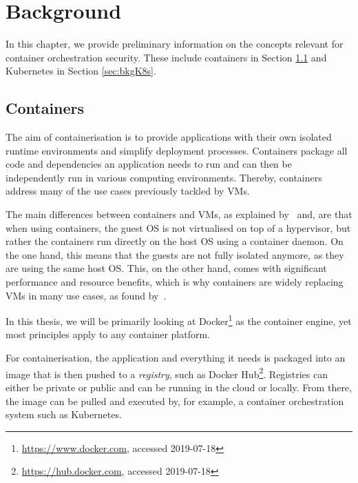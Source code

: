 
\chapter{Background} \label{cha:background}

In this chapter, we provide preliminary information on the concepts relevant for container orchestration security. These include containers in Section \ref{sec:bkgContainers} and Kubernetes in Section \ref{sec:bkgK8s}.

\section{Containers} \label{sec:bkgContainers}

The aim of containerisation is to provide applications with their own isolated runtime environments and simplify deployment processes. Containers package all code and dependencies an application needs to run and can then be independently run in various computing environments. Thereby, containers address many of the use cases previously tackled by \acp{VM}. 

The main differences between containers and \acp{VM}, as explained by~\textcite{containersVsVMs} and\textcite{containersVsVMsComparison}, are that when using containers, the guest OS is not virtualised on top of a hypervisor, but rather the containers run directly on the host OS using a container daemon. On the one hand, this means that the guests are not fully isolated anymore, as they are using the same host OS. This, on the other hand, comes with significant performance and resource benefits, which is why containers are widely replacing \acp{VM} in many use cases, as found by~\textcite{redhatOutlook}.

In this thesis, we will be primarily looking at Docker\footnote{\url{https://www.docker.com}, accessed 2019-07-18} as the container engine, yet most principles apply to any container platform.

For containerisation, the application and everything it needs is packaged into an image that is then pushed to a \textit{registry}, such as Docker Hub\footnote{\url{https://hub.docker.com}, accessed 2019-07-18}. Registries can either be private or public and can be running in the cloud or locally. From there, the image can be pulled and executed by, for example, a container orchestration system such as Kubernetes. 

